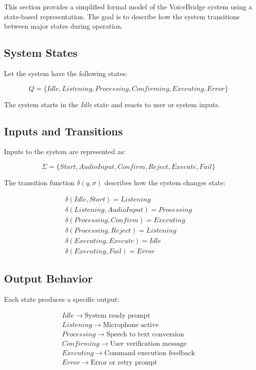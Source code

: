 \documentclass[11pt]{article}
\begin{document}
This section provides a simplified formal model of the VoiceBridge system using a state-based representation.  
The goal is to describe how the system transitions between major states during operation.

\subsection{System States}

Let the system have the following states:

\[
Q = \{Idle, Listening, Processing, Confirming, Executing, Error\}
\]

The system starts in the \textit{Idle} state and reacts to user or system inputs.

\subsection{Inputs and Transitions}

Inputs to the system are represented as:

\[
\Sigma = \{Start, AudioInput, Confirm, Reject, Execute, Fail\}
\]

The transition function $\delta(q, \sigma)$ describes how the system changes state:

\[
\begin{array}{ll}
\delta(Idle, Start) = Listening \\
\delta(Listening, AudioInput) = Processing \\
\delta(Processing, Confirm) = Executing \\
\delta(Processing, Reject) = Listening \\
\delta(Executing, Execute) = Idle \\
\delta(Executing, Fail) = Error
\end{array}
\]

\subsection{Output Behavior}

Each state produces a specific output:

\[
\begin{array}{ll}
Idle \rightarrow \text{System ready prompt} \\
Listening \rightarrow \text{Microphone active} \\
Processing \rightarrow \text{Speech to text conversion} \\
Confirming \rightarrow \text{User verification message} \\
Executing \rightarrow \text{Command execution feedback} \\
Error \rightarrow \text{Error or retry prompt}
\end{array}
\]
\end{document}
